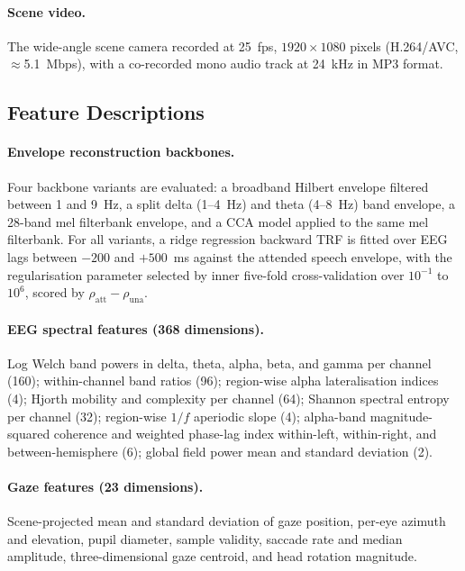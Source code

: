 \documentclass{article}
\begin{document}
\paragraph{Scene video.} The wide-angle scene camera recorded at 25~fps,
$1920 \times 1080$ pixels (H.264/AVC, $\approx$5.1~Mbps), with a
co-recorded mono audio track at 24~kHz in MP3 format.

\subsection{Feature Descriptions}
\label{app:features}

\paragraph{Envelope reconstruction backbones.}
Four backbone variants are evaluated: a broadband Hilbert envelope filtered 
between 1 and 9~Hz, a split delta (1--4~Hz) and theta (4--8~Hz) band 
envelope, a 28-band mel filterbank envelope, and a CCA model applied to the 
same mel filterbank. For all variants, a ridge regression backward TRF is 
fitted over EEG lags between $-200$ and $+500$~ms against the attended speech 
envelope, with the regularisation parameter selected by inner five-fold 
cross-validation over $10^{-1}$ to $10^{6}$, scored by 
$\rho_{\text{att}} - \rho_{\text{una}}$.

\paragraph{EEG spectral features (368 dimensions).}
Log Welch band powers in delta, theta, alpha, beta, and gamma per channel 
(160); within-channel band ratios (96); region-wise alpha lateralisation 
indices (4); Hjorth mobility and complexity per channel (64); Shannon spectral 
entropy per channel (32); region-wise $1/f$ aperiodic slope (4); alpha-band 
magnitude-squared coherence and weighted phase-lag index within-left, 
within-right, and between-hemisphere (6); global field power mean and standard 
deviation (2).

\paragraph{Gaze features (23 dimensions).}
Scene-projected mean and standard deviation of gaze position, per-eye azimuth 
and elevation, pupil diameter, sample validity, saccade rate and median 
amplitude, three-dimensional gaze centroid, and head rotation magnitude.
\end{document}
